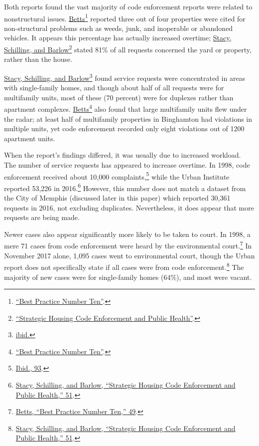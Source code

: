 \documentclass[
  openany]{book}
\begin{document}
Both reports found the vast majority of code enforcement reports were related to nonstructural issues. \protect\hyperlink{ref-betts2001}{Betts}\footnote{\protect\hyperlink{ref-betts2001}{{``Best Practice Number Ten''}}.} reported three out of four properties were cited for non-structural problems such as weeds, junk, and inoperable or abandoned vehicles. It appears this percentage has actually increased overtime; \protect\hyperlink{ref-stacy2018}{Stacy, Schilling, and Barlow}\footnote{\protect\hyperlink{ref-stacy2018}{{``Strategic Housing Code Enforcement and Public Health''}}.} stated 81\% of all requests concerned the yard or property, rather than the house.

\protect\hyperlink{ref-stacy2018}{Stacy, Schilling, and Barlow}\footnote{\protect\hyperlink{ref-stacy2018}{ibid.}} found service requests were concentrated in areas with single-family homes, and though about half of all requests were for multifamily units, most of these (70 percent) were for duplexes rather than apartment complexes. \protect\hyperlink{ref-betts2001}{Betts}\footnote{\protect\hyperlink{ref-betts2001}{{``Best Practice Number Ten''}}.} also found that large multifamily units flew under the radar; at least half of multifamily properties in Binghamton had violations in multiple units, yet code enforcement recorded only eight violations out of 1200 apartment units.

When the report's findings differed, it was usually due to increased workload. The number of service requests has appeared to increase overtime. In 1998, code enforcement received about 10,000 complaints,\footnote{\protect\hyperlink{ref-betts2001}{Ibid., 93}.} while the Urban Institute reported 53,226 in 2016.\footnote{\protect\hyperlink{ref-stacy2018}{Stacy, Schilling, and Barlow, {``Strategic Housing Code Enforcement and Public Health,''} 51}.} However, this number does not match a dataset from the City of Memphis (discussed later in this paper) which reported 30,361 requests in 2016, not excluding duplicates. Nevertheless, it does appear that more requests are being made.

Newer cases also appear significantly more likely to be taken to court. In 1998, a mere 71 cases from code enforcement were heard by the environmental court.\footnote{\protect\hyperlink{ref-betts2001}{Betts, {``Best Practice Number Ten,''} 49}.} In November 2017 alone, 1,095 cases went to environmental court, though the Urban report does not specifically state if all cases were from code enforcement.\footnote{\protect\hyperlink{ref-stacy2018}{Stacy, Schilling, and Barlow, {``Strategic Housing Code Enforcement and Public Health,''} 51}.} The majority of new cases were for single-family homes (64\%), and most were vacant.
\end{document}
